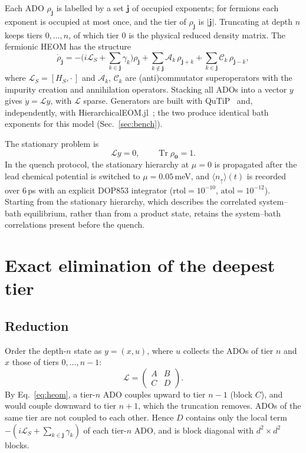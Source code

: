 \documentclass[11pt,a4paper]{article}
\newcommand{\Lc}{\mathcal{L}}
\newcommand{\tr}{\operatorname{Tr}}
\begin{document}
Each ADO $\rho_{\mathbf{j}}$ is labelled by a set $\mathbf{j}$ of occupied
exponents; for fermions each exponent is occupied at most once, and the tier of
$\rho_{\mathbf{j}}$ is $|\mathbf{j}|$. Truncating at depth $n$ keeps tiers
$0,\dots,n$, of which tier $0$ is the physical reduced density matrix. The
fermionic HEOM has the structure~\cite{Jin2008}
\begin{equation}
\dot\rho_{\mathbf{j}} = -\Big(i\Lc_S + \sum_{k\in\mathbf{j}} \gamma_k\Big)\rho_{\mathbf{j}}
+ \sum_{k\notin\mathbf{j}} \mathcal{A}_k\, \rho_{\mathbf{j}+k}
+ \sum_{k\in\mathbf{j}} \mathcal{C}_k\, \rho_{\mathbf{j}-k},
\label{eq:heom}
\end{equation}
where $\Lc_S = [H_S,\cdot\,]$ and $\mathcal{A}_k$, $\mathcal{C}_k$ are
(anti)commutator superoperators with the impurity creation and annihilation
operators. Stacking all ADOs into a vector $y$ gives $\dot y = \Lc y$, with $\Lc$
sparse. Generators are built with QuTiP~\cite{Lambert2023} and, independently,
with HierarchicalEOM.jl~\cite{Huang2023}; the two produce identical bath
exponents for this model (Sec.~\ref{sec:bench}).

The stationary problem is
\begin{equation}
\Lc y = 0, \qquad \tr \rho_{\mathbf{0}} = 1 .
\label{eq:stationary}
\end{equation}
In the quench protocol, the stationary hierarchy at $\mu = 0$ is propagated after
the lead chemical potential is switched to $\mu = 0.05$\,meV, and
$\langle n_\uparrow\rangle(t)$ is recorded over 6\,ps with an explicit DOP853
integrator ($\mathrm{rtol} = 10^{-10}$, $\mathrm{atol} = 10^{-12}$). Starting from
the stationary hierarchy, which describes the correlated system--bath
equilibrium, rather than from a product state, retains the system--bath
correlations present before the quench.

\section{Exact elimination of the deepest tier}\label{sec:method}

\subsection{Reduction}

Order the depth-$n$ state as $y = (x, u)$, where $u$ collects the ADOs of tier $n$
and $x$ those of tiers $0,\dots,n-1$:
\begin{equation}
\Lc = \begin{pmatrix} A & B \\ C & D \end{pmatrix}.
\end{equation}
By Eq.~\eqref{eq:heom}, a tier-$n$ ADO couples upward to tier $n-1$ (block $C$),
and would couple downward to tier $n+1$, which the truncation removes. ADOs of
the same tier are not coupled to each other. Hence $D$ contains only the local
term $-(i\Lc_S + \sum_{k\in\mathbf{j}}\gamma_k)$ of each tier-$n$ ADO, and is
block diagonal with $d^2\times d^2$ blocks.
\end{document}
